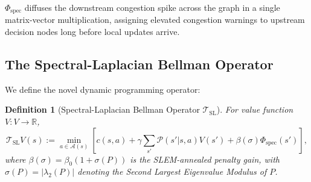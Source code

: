 \documentclass[11pt,a4paper]{article}
\newtheorem{definition}{Definition}
\begin{document}
$\Phi_{\text{spec}}$ diffuses the downstream congestion spike across the graph in a single matrix-vector multiplication, assigning elevated congestion warnings to upstream decision nodes long before local updates arrive.

\subsection{The Spectral-Laplacian Bellman Operator}
We define the novel dynamic programming operator:
\begin{definition}[Spectral-Laplacian Bellman Operator $\mathcal{T}_{\text{SL}}$]
For value function $V: V \to \mathbb{R}$,
\begin{equation}
\mathcal{T}_{\text{SL}} V(s) := \min_{a \in \mathcal{A}(s)} \left[ c(s, a) + \gamma \sum_{s'} \mathcal{P}(s'|s, a) V(s') + \beta(\sigma) \Phi_{\text{spec}}(s') \right],
\end{equation}
where $\beta(\sigma) = \beta_0 (1 + \sigma(P))$ is the SLEM-annealed penalty gain, with $\sigma(P) = |\lambda_2(P)|$ denoting the Second Largest Eigenvalue Modulus of $P$.
\end{definition}
\end{document}
